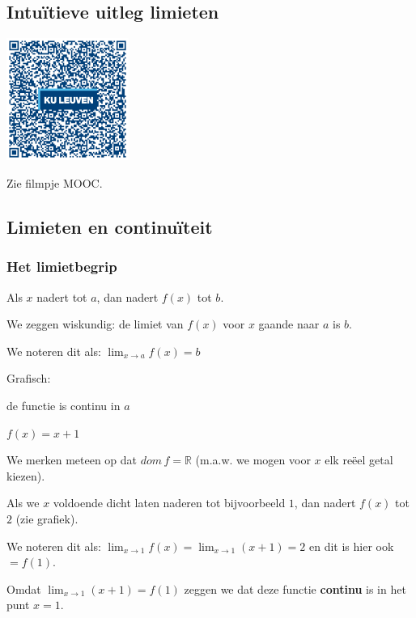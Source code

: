 \subsection{Intu\"itieve uitleg limieten}
\begin{minipage}{.25\linewidth}
	\raggedright
	\includegraphics[width=4cm]{2_elem_rekenvaardigheden_B/inputs/QR_Code_LIMIETEN_module2new}
\end{minipage}
\begin{minipage}{.7\linewidth}
	Zie filmpje MOOC.
\end{minipage}

\subsection{Limieten en continu\"iteit}

\subsubsection{Het limietbegrip}

Als $x$ nadert tot $a$, dan nadert $f(x)$ tot $b$.

We zeggen wiskundig: de limiet van $f(x)$ voor $x$ gaande
naar $a$ is $b$.

We noteren dit als: $\lim_{x\to a}f(x)=b$

Grafisch:


\begin{figure}[H]
\centering

\end{figure}


\begin{voorbeeld}
de functie is continu in $a$ 

$f(x)=x+1$


\begin{figure}[H]
	\centering
	
\end{figure}


We merken meteen op dat $dom\,f=\mathbb{R}$ (m.a.w. we mogen voor
$x$ elk re\"eel getal kiezen).

Als we $x$ voldoende dicht laten naderen tot bijvoorbeeld $1$, dan
nadert $f(x)$ tot $2$ (zie grafiek).

We noteren dit als: $\lim_{x\to1}f(x)=\lim_{x\to1}(x+1)=2$
en dit is hier ook $=f(1)$.

Omdat $\lim_{x\to1}(x+1)=f(1)$ zeggen we dat deze
functie \textbf{continu} is in het punt $x=1$.

\end{voorbeeld}



